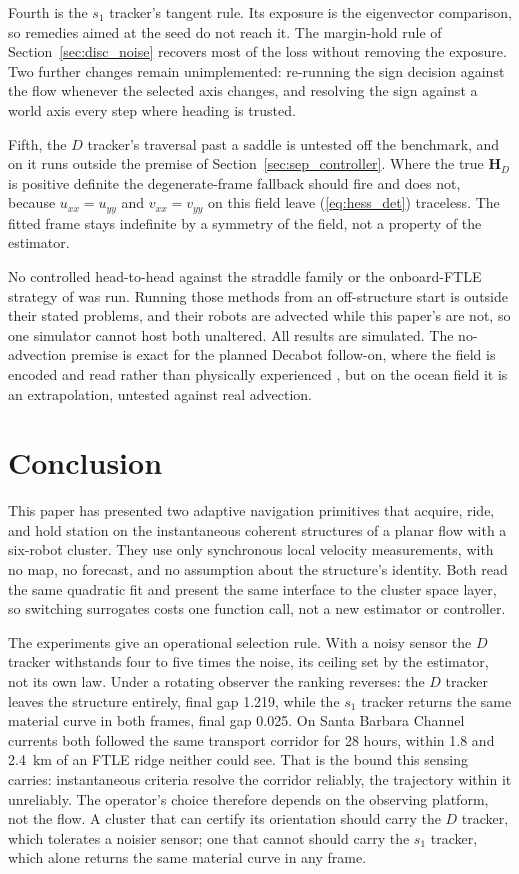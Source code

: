 \documentclass[lettersize,journal]{IEEEtran}
\begin{document}
Fourth is the $s_1$ tracker's tangent rule. Its exposure
is the eigenvector comparison, so remedies aimed at
the seed do not reach it. The margin-hold rule of Section~\ref{sec:disc_noise} recovers most of the loss without removing the exposure. Two further changes remain unimplemented: re-running the sign decision against the flow whenever the selected axis changes, and resolving the sign against a world axis every step where heading is trusted.

Fifth, the $D$ tracker's traversal past a saddle is untested off the
benchmark, and on it runs outside the premise of
Section~\ref{sec:sep_controller}. Where the true $\mathbf{H}_D$ is
positive definite the degenerate-frame fallback should fire and does
not, because $u_{xx} = u_{yy}$ and $v_{xx} = v_{yy}$ on this field
leave (\ref{eq:hess_det}) traceless. The fitted frame stays indefinite by a symmetry of the field, not a
property of the estimator.

No controlled head-to-head against the straddle family \cite{26,27,28} or the onboard-FTLE strategy of \cite{30} was run. Running those methods from an off-structure start is outside their stated problems, and their robots are advected while this paper's are not, so one simulator cannot host both unaltered.
All results are simulated. The no-advection premise is exact for the
planned Decabot follow-on, where the field is encoded and read rather
than physically experienced \cite{34}, but on the ocean field it is an
extrapolation, untested against real advection.

\section{Conclusion}

This paper has presented two adaptive navigation primitives that acquire, ride, and hold station on the instantaneous coherent structures of a planar flow with a six-robot cluster. They use only synchronous local velocity measurements, with no map, no forecast, and no assumption about the structure's identity. Both read the same
quadratic fit and present the same interface to the cluster space layer,
so switching surrogates costs one function call, not a new estimator or
controller.

The experiments give an operational selection rule. With a noisy sensor
the $D$ tracker withstands four to five times the noise, its ceiling set by the
estimator, not its own law. Under a rotating observer the
ranking reverses: the $D$ tracker leaves the structure entirely, final
gap 1.219, while the $s_1$ tracker returns the same material curve in
both frames, final gap 0.025. On Santa Barbara Channel currents both followed the same transport corridor for 28 hours, within 1.8 and 2.4~km of an FTLE ridge neither could see. That is the bound this sensing carries: instantaneous criteria resolve the corridor reliably, the trajectory within it unreliably. The operator's choice
therefore depends on the observing platform, not the flow. A cluster
that can certify its orientation should carry the $D$ tracker, which
tolerates a noisier sensor; one that cannot should carry the $s_1$
tracker, which alone returns the same material curve in any frame.
\end{document}
